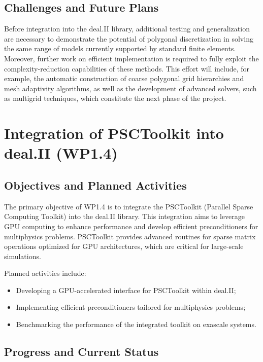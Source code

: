 \documentclass[a4paper,12pt]{article}
\begin{document}
 \subsection{Challenges and Future Plans}

Before integration into the deal.II library, additional testing and generalization are necessary to demonstrate the potential of polygonal discretization in solving the same range of models currently supported by standard finite elements. Moreover, further work on efficient implementation is required to fully exploit the complexity-reduction capabilities of these methods. This effort will include, for example, the automatic construction of coarse polygonal grid hierarchies and mesh adaptivity algorithms, as well as the development of advanced solvers, such as multigrid techniques, which constitute the next phase of the project.


\section{Integration of PSCToolkit into deal.II (WP1.4)}
    \subsection{Objectives and Planned Activities}
        The primary objective of WP1.4 is to integrate the PSCToolkit (Parallel Sparse Computing Toolkit) into the deal.II library. This integration aims to leverage GPU computing to enhance performance and develop efficient preconditioners for multiphysics problems. PSCToolkit provides advanced routines for sparse matrix operations optimized for GPU architectures, which are critical for large-scale simulations.

        Planned activities include:
        \begin{itemize}
            \item Developing a GPU-accelerated interface for PSCToolkit within deal.II;
            \item Implementing efficient preconditioners tailored for multiphysics problems;
            \item Benchmarking the performance of the integrated toolkit on exascale systems.
        \end{itemize}

        \subsection{Progress and Current Status}
 
\end{document}

